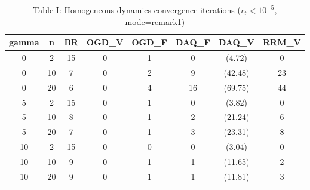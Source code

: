 \begin{table}[htbp]
\centering
\caption{Table I: Homogeneous dynamics convergence iterations ($r_t < 10^{-5}$, mode=remark1)}
\label{tab:table1_remark1}
\begin{tabular}{cccccccc}
\hline
gamma & n & BR & OGD_V & OGD_F & DAQ_F & DAQ_V & RRM_V \\
\hline
0 & 2 & 15 & 0 & 1 & 0 & (4.72) & 0 \\
0 & 10 & 7 & 0 & 2 & 9 & (42.48) & 23 \\
0 & 20 & 6 & 0 & 4 & 16 & (69.75) & 44 \\
5 & 2 & 15 & 0 & 1 & 0 & (3.82) & 0 \\
5 & 10 & 8 & 0 & 1 & 2 & (21.24) & 6 \\
5 & 20 & 7 & 0 & 1 & 3 & (23.31) & 8 \\
10 & 2 & 15 & 0 & 0 & 0 & (3.04) & 0 \\
10 & 10 & 9 & 0 & 1 & 1 & (11.65) & 2 \\
10 & 20 & 9 & 0 & 1 & 1 & (11.81) & 3 \\
\hline
\end{tabular}
\end{table}
